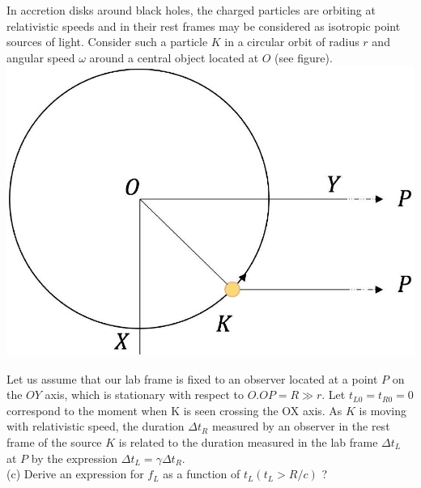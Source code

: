 \documentclass[10pt]{article}
\begin{document}
In accretion disks around black holes, the charged particles are orbiting at relativistic speeds and in their rest frames may be considered as isotropic point sources of light. Consider such a particle $K$ in a circular orbit of radius $r$ and angular speed $\omega$ around a central object located at $O$ (see figure).\\
\includegraphics[max width=\textwidth, center]{2025_09_11_6312450c103d6a7e5736g-10}

Let us assume that our lab frame is fixed to an observer located at a point $P$ on the $O Y$ axis, which is stationary with respect to $O . O P=R \gg r$. Let $t_{L 0}=t_{R 0}=0$ correspond to the moment when K is seen crossing the OX axis. As $K$ is moving with relativistic speed, the duration $\Delta t_{R}$ measured by an observer in the rest frame of the source $K$ is related to the duration measured in the lab frame $\Delta t_{L}$ at $P$ by the expression $\Delta t_{L}=\gamma \Delta t_{R}$.\\
(c) Derive an expression for $f_{L}$ as a function of $t_{L}\left(t_{L}>R / c\right)$ ?
\end{document}
